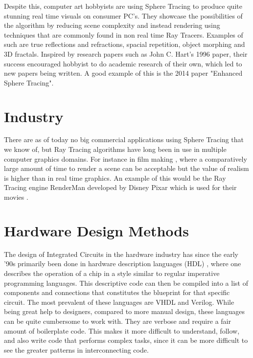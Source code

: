 		Despite this, computer art hobbyists are using Sphere Tracing to
		produce quite stunning real time visuals on consumer PC's. They
		showcase the possibilities of the algorithm by reducing scene
		complexity and instead rendering using techniques that are commonly
		found in non real time Ray Tracers. Examples of such are true
		reflections and refractions, spacial repetition, object morphing and 3D
		fractals\cite{InigoQuilez}.  Inspired by research papers such as John
		C. Hart's 1996 paper\cite{Hart1996}, their success encouraged hobbyist
		to do academic research of their own, which led to new papers being
		written. A good example of this is the 2014 paper "Enhanced Sphere
		Tracing"\cite{Korndorfer2014}.

	\section{ Industry }		

		There are as of today no big commercial applications using Sphere
		Tracing that we know of, but Ray Tracing algorithms have long been in
		use in multiple computer graphics domains. For instance in film making
		\cite{TODO}, where a comparatively large amount of time to render a
		scene can be acceptable but the value of realism is higher than in real
		time graphics. An example of this would be the Ray Tracing engine
		RenderMan developed by Disney Pixar which is used for their movies
		\cite{TODO}.
	
	\section{ Hardware Design Methods } 
	
		The design of Integrated Circuits in the hardware industry has since
		the early '90s primarily been done in hardware description languages
		(HDL) \cite{Chen2012}, where one describes the operation of a chip in a
		style similar to regular imperative programming languages. This
		descriptive code can then be compiled into a list of components and
		connections that constitutes the blueprint for that specific circuit.
		The most prevalent of these languages are VHDL and Verilog\cite{TODO}.
		While being great help to designers, compared to more manual design,
		these languages can be quite cumbersome to work with. They are verbose
		and require a fair amount of boilerplate code. This makes it more
		difficult to understand, follow, and also write code that performs
		complex tasks, since it can be more difficult to see the greater
		patterns in interconnecting code\cite{TODO}.
		
